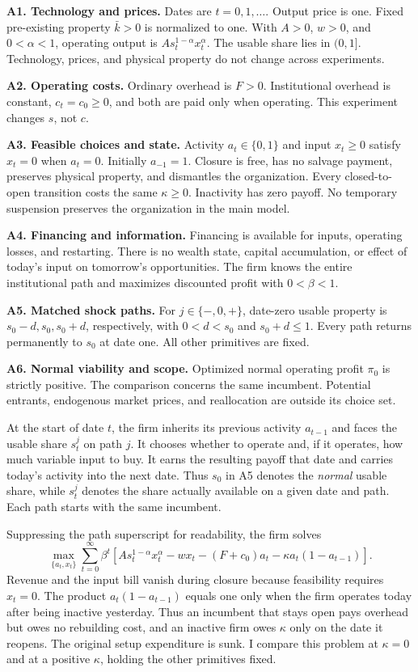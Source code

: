 \documentclass[11pt,letterpaper]{article}
\begin{document}
\textbf{A1. Technology and prices.} Dates are $t=0,1,\ldots$. Output price is one. Fixed pre-existing property $\bar k>0$ is normalized to one. With $A>0$, $w>0$, and $0<\alpha<1$, operating output is $As_t^{1-\alpha}x_t^\alpha$. The usable share lies in $(0,1]$. Technology, prices, and physical property do not change across experiments.

\textbf{A2. Operating costs.} Ordinary overhead is $F>0$. Institutional overhead is constant, $c_t=c_0\geq0$, and both are paid only when operating. This experiment changes $s$, not $c$.

\textbf{A3. Feasible choices and state.} Activity $a_t\in\{0,1\}$ and input $x_t\geq0$ satisfy $x_t=0$ when $a_t=0$. Initially $a_{-1}=1$. Closure is free, has no salvage payment, preserves physical property, and dismantles the organization. Every closed-to-open transition costs the same $\kappa\geq0$. Inactivity has zero payoff. No temporary suspension preserves the organization in the main model.

\textbf{A4. Financing and information.} Financing is available for inputs, operating losses, and restarting. There is no wealth state, capital accumulation, or effect of today's input on tomorrow's opportunities. The firm knows the entire institutional path and maximizes discounted profit with $0<\beta<1$.

\textbf{A5. Matched shock paths.} For $j\in\{-,0,+\}$, date-zero usable property is $s_0-d,s_0,s_0+d$, respectively, with $0<d<s_0$ and $s_0+d\leq1$. Every path returns permanently to $s_0$ at date one. All other primitives are fixed.

\textbf{A6. Normal viability and scope.} Optimized normal operating profit $\pi_0$ is strictly positive. The comparison concerns the same incumbent. Potential entrants, endogenous market prices, and reallocation are outside its choice set.

At the start of date $t$, the firm inherits its previous activity $a_{t-1}$ and faces the usable share $s_t^j$ on path $j$. It chooses whether to operate and, if it operates, how much variable input to buy. It earns the resulting payoff that date and carries today's activity into the next date. Thus $s_0$ in A5 denotes the \emph{normal} usable share, while $s_t^j$ denotes the share actually available on a given date and path. Each path starts with the same incumbent.

Suppressing the path superscript for readability, the firm solves
\begin{equation}\label{eq:full}
\max_{\{a_t,x_t\}}\sum_{t=0}^{\infty}\beta^t
\left[As_t^{1-\alpha}x_t^\alpha-wx_t-(F+c_0)a_t
-\kappa a_t(1-a_{t-1})\right].
\end{equation}
Revenue and the input bill vanish during closure because feasibility requires $x_t=0$. The product $a_t(1-a_{t-1})$ equals one only when the firm operates today after being inactive yesterday. Thus an incumbent that stays open pays overhead but owes no rebuilding cost, and an inactive firm owes $\kappa$ only on the date it reopens. The original setup expenditure is sunk. I compare this problem at $\kappa=0$ and at a positive $\kappa$, holding the other primitives fixed.
\end{document}
